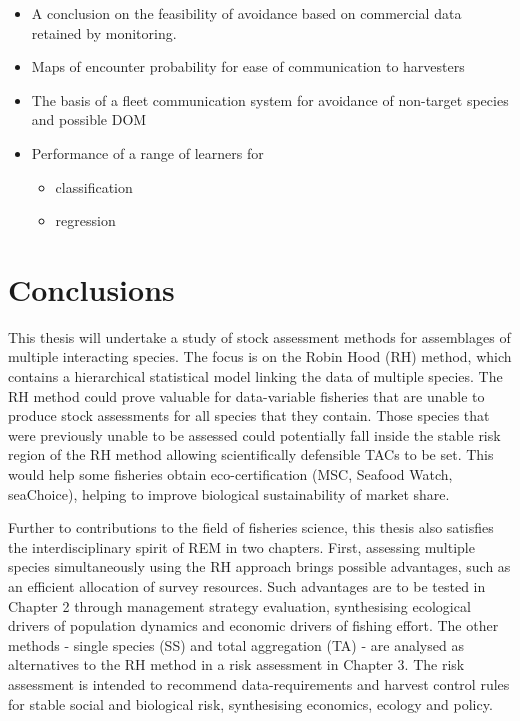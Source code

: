 \documentclass[12pt,]{scrartcl}
\providecommand{\tightlist}{%
  \setlength{\itemsep}{0pt}\setlength{\parskip}{0pt}}
\begin{document}
\begin{itemize}
\tightlist
\item
  A conclusion on the feasibility of avoidance based on commercial data
  retained by monitoring.
\item
  Maps of encounter probability for ease of communication to harvesters
\item
  The basis of a fleet communication system for avoidance of non-target
  species and possible DOM
\item
  Performance of a range of learners for

  \begin{itemize}
  \tightlist
  \item
    classification
  \item
    regression
  \end{itemize}
\end{itemize}

\section{Conclusions}\label{conclusions}

This thesis will undertake a study of stock assessment methods for
assemblages of multiple interacting species. The focus is on the Robin
Hood (RH) method, which contains a hierarchical statistical model
linking the data of multiple species. The RH method could prove valuable
for data-variable fisheries that are unable to produce stock assessments
for all species that they contain. Those species that were previously
unable to be assessed could potentially fall inside the stable risk
region of the RH method allowing scientifically defensible TACs to be
set. This would help some fisheries obtain eco-certification (MSC,
Seafood Watch, seaChoice), helping to improve biological sustainability
of market share.

Further to contributions to the field of fisheries science, this thesis
also satisfies the interdisciplinary spirit of REM in two chapters.
First, assessing multiple species simultaneously using the RH approach
brings possible advantages, such as an efficient allocation of survey
resources. Such advantages are to be tested in Chapter 2 through
management strategy evaluation, synthesising ecological drivers of
population dynamics and economic drivers of fishing effort. The other
methods - single species (SS) and total aggregation (TA) - are analysed
as alternatives to the RH method in a risk assessment in Chapter 3. The
risk assessment is intended to recommend data-requirements and harvest
control rules for stable social and biological risk, synthesising
economics, ecology and policy.
\end{document}
